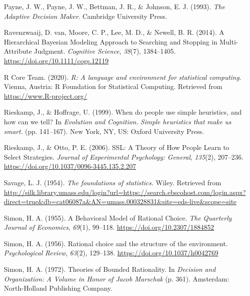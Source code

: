 \documentclass[
  english,
  man]{apa6}
\newlength{\cslhangindent}
\newenvironment{cslreferences}%
  {\setlength{\parindent}{0pt}%
  \everypar{\setlength{\hangindent}{\cslhangindent}}\ignorespaces}%
  {\par}
\begin{document}
\begin{cslreferences}
\leavevmode\hypertarget{ref-payneAdaptiveDecisionMaker1993}{}%
Payne, J. W., Payne, J. W., Bettman, J. R., \& Johnson, E. J. (1993). \emph{The Adaptive Decision Maker}. Cambridge University Press.

\leavevmode\hypertarget{ref-vanravenzwaaijHierarchicalBayesianModeling2014}{}%
Ravenzwaaij, D. van, Moore, C. P., Lee, M. D., \& Newell, B. R. (2014). A Hierarchical Bayesian Modeling Approach to Searching and Stopping in Multi-Attribute Judgment. \emph{Cognitive Science}, \emph{38}(7), 1384--1405. \url{https://doi.org/10.1111/cogs.12119}

\leavevmode\hypertarget{ref-R-base}{}%
R Core Team. (2020). \emph{R: A language and environment for statistical computing}. Vienna, Austria: R Foundation for Statistical Computing. Retrieved from \url{https://www.R-project.org/}

\leavevmode\hypertarget{ref-rieskampWhenPeopleUse1999}{}%
Rieskamp, J., \& Hoffrage, U. (1999). When do people use simple heuristics, and how can we tell? In \emph{Evolution and Cognition.} \emph{Simple heuristics that make us smart.} (pp. 141--167). New York, NY, US: Oxford University Press.

\leavevmode\hypertarget{ref-rieskampSSLTheoryHow2006}{}%
Rieskamp, J., \& Otto, P. E. (2006). SSL: A Theory of How People Learn to Select Strategies. \emph{Journal of Experimental Psychology: General}, \emph{135}(2), 207--236. \url{https://doi.org/10.1037/0096-3445.135.2.207}

\leavevmode\hypertarget{ref-savageFoundationsStatistics1954}{}%
Savage, L. J. (1954). \emph{The foundations of statistics.} Wiley. Retrieved from \url{http://silk.library.umass.edu/login?url=https://search.ebscohost.com/login.aspx?direct=true\&db=cat06087a\&AN=umass.000328831\&site=eds-live\&scope=site}

\leavevmode\hypertarget{ref-simonBehavioralModelRational1955}{}%
Simon, H. A. (1955). A Behavioral Model of Rational Choice. \emph{The Quarterly Journal of Economics}, \emph{69}(1), 99--118. \url{https://doi.org/10.2307/1884852}

\leavevmode\hypertarget{ref-simonRationalChoiceStructure1956}{}%
Simon, H. A. (1956). Rational choice and the structure of the environment. \emph{Psychological Review}, \emph{63}(2), 129--138. \url{https://doi.org/10.1037/h0042769}

\leavevmode\hypertarget{ref-simonTheoriesBoundedRationality1972}{}%
Simon, H. A. (1972). Theories of Bounded Rationality. In \emph{Decision and Organization: A Volume in Honor of Jacob Marschak} (p. 361). Amsterdam: North-Holland Publishing Company.


\end{cslreferences}
\end{document}
